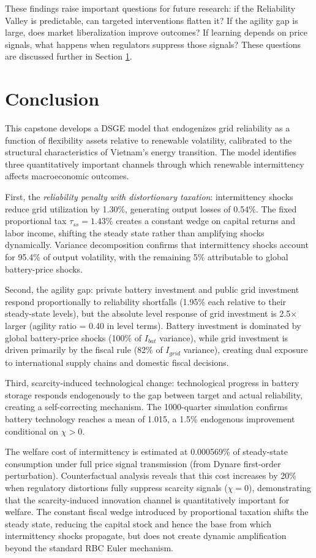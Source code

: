 \documentclass[12pt, a4paper]{article}
\begin{document}
	These findings raise important questions for future research: if the Reliability Valley is predictable, can targeted interventions flatten it? If the agility gap is large, does market liberalization improve outcomes? If learning depends on price signals, what happens when regulators suppress those signals? These questions are discussed further in Section \ref{sec:conclusion}.

	\section{Conclusion} \label{sec:conclusion}

	This capstone develops a DSGE model that endogenizes grid reliability as a function of flexibility assets relative to renewable volatility, calibrated to the structural characteristics of Vietnam's energy transition. The model identifies three quantitatively important channels through which renewable intermittency affects macroeconomic outcomes.

	First, the \textit{reliability penalty with distortionary taxation}: intermittency shocks reduce grid utilization by 1.30\%, generating output losses of 0.54\%. The fixed proportional tax $\tau_{ss}=1.43\%$ creates a constant wedge on capital returns and labor income, shifting the steady state rather than amplifying shocks dynamically. Variance decomposition confirms that intermittency shocks account for 95.4\% of output volatility, with the remaining 5\% attributable to global battery-price shocks.

	Second, the agility gap: private battery investment and public grid investment respond proportionally to reliability shortfalls (1.95\% each relative to their steady-state levels), but the absolute level response of grid investment is 2.5$\times$ larger (agility ratio = 0.40 in level terms). Battery investment is dominated by global battery-price shocks (100\% of $I_{bat}$ variance), while grid investment is driven primarily by the fiscal rule (82\% of $I_{grid}$ variance), creating dual exposure to international supply chains and domestic fiscal decisions.

	Third, scarcity-induced technological change: technological progress in battery storage responds endogenously to the gap between target and actual reliability, creating a self-correcting mechanism. The 1000-quarter simulation confirms battery technology reaches a mean of 1.015, a 1.5\% endogenous improvement conditional on $\chi > 0$.

	The welfare cost of intermittency is estimated at 0.000569\% of steady-state consumption under full price signal transmission (from Dynare first-order perturbation). Counterfactual analysis reveals that this cost increases by 20\% when regulatory distortions fully suppress scarcity signals ($\chi = 0$), demonstrating that the scarcity-induced innovation channel is quantitatively important for welfare. The constant fiscal wedge introduced by proportional taxation shifts the steady state, reducing the capital stock and hence the base from which intermittency shocks propagate, but does not create dynamic amplification beyond the standard RBC Euler mechanism.
\end{document}
